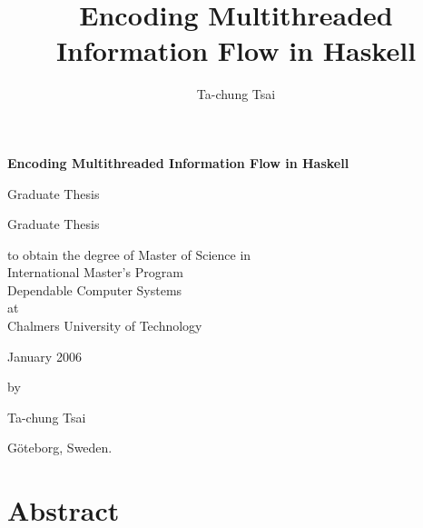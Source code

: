 \documentclass{report}
\title{Encoding Multithreaded Information Flow in Haskell}
\author{Ta-chung Tsai}
\newcommand{\myTitle}{Encoding Multithreaded Information Flow in Haskell}
\newcommand{\mySubtitle}{}
\newcommand{\myAuthor}{Ta-chung Tsai}
\begin{document}
\pagestyle{plain}

\thispagestyle{empty}

\clearpage
\par\vskip 2cm
\begin{center}
{\Huge\bf \myTitle                                         %
\vskip 1cm \Large \mySubtitle                              }           %
\par\vspace {6cm}
{\large Graduate Thesis }
\par\vspace {1cm}
{\large Graduate Thesis }
\par\vspace {1cm}
{\large to obtain the degree of Master of Science in \\
International Master's Program \\
Dependable Computer Systems \\
at \\
Chalmers University of Technology  }
\par \vspace{1cm}
{\large January 2006  }            %
\par\vspace {1cm} {\large by}
\par \vspace {1cm}
{\Large \myAuthor            }                                  %
\par\vspace {1cm}
{\large G\"{o}teborg, Sweden.}                 %
\end{center}

\clearpage



\tableofcontents

\listoffigures
{}

\listoftables
{}

\chapter*{Abstract}

\end{document}
